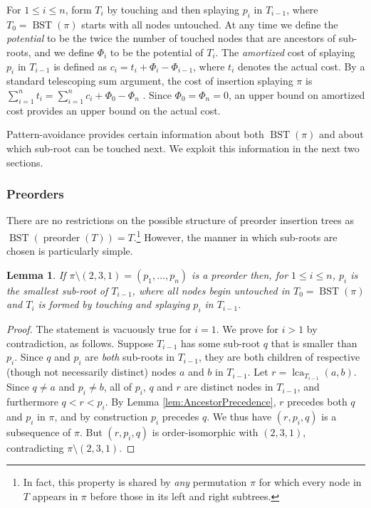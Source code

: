 \documentclass{article}
\theoremstyle{plain}
\newtheorem{lemma}{Lemma}
\theoremstyle{definition}
\DeclareMathOperator{\Preorder}{preorder}
\DeclareMathOperator{\BST}{BST}  %
\DeclareMathOperator{\LCA}{lca}  %
\begin{document}
%
For $1\le i\le n$, form $T_i$ by touching and then splaying $p_i$ in $T_{i-1}$,
where $T_0=\BST(\pi)$ starts with all nodes untouched. At any time we define
the \emph{potential} to be the twice the number of touched nodes that are
ancestors of sub-roots, and we define $\Phi_i$ to be the potential of $T_i$.
The \emph{amortized} cost of splaying $p_i$ in $T_{i-1}$ is defined as
$c_i=t_i+\Phi_i-\Phi_{i-1}$, where $t_i$ denotes the actual cost. By a standard
telescoping sum argument, the cost of insertion splaying $\pi$ is $\sum_{i=1}^n
t_i = \sum_{i=1}^n c_i + \Phi_0 - \Phi_n$ \cite{AMORTIZED_TIME}. Since
$\Phi_0=\Phi_n=0$, an upper bound on amortized cost provides an upper bound on
the actual cost.

%
Pattern-avoidance provides certain information about both $\BST(\pi)$ and about
which sub-root can be touched next. We exploit this information in the next two
sections.

\subsubsection*{Preorders}

%
There are no restrictions on the possible structure of preorder insertion trees
as $\BST(\Preorder(T))=T$.\footnote{In fact, this property is shared by
\emph{any} permutation $\pi$ for which every node in $T$ appears in $\pi$
before those in its left and right subtrees.} However, the manner in which
sub-roots are chosen is particularly simple.

%
\begin{lemma}\label{lem:PreorderSubroots}
If $\pi\setminus(2,3,1)=(p_1,\dots,p_n)$ is a preorder then, for $1\le i\le n$,
$p_i$ is the smallest sub-root of $T_{i-1}$, where all nodes begin untouched in
$T_0=\BST(\pi)$ and $T_i$ is formed by touching and splaying $p_i$ in $T_{i-1}$.
\end{lemma}

%
\begin{proof}
The statement is vacuously true for $i=1$. We prove for $i>1$ by contradiction,
as follows. Suppose $T_{i-1}$ has some sub-root $q$ that is smaller than $p_i$.
Since $q$ and $p_i$ are \emph{both} sub-roots in $T_{i-1}$, they are both
children of respective (though not necessarily distinct) nodes $a$ and $b$ in
$T_{i-1}$. Let $r=\LCA_{T_{i-1}}(a,b)$. Since $q\ne a$ and $p_i\ne b$, all of
$p_i$, $q$ and $r$ are distinct nodes in $T_{i-1}$, and furthermore $q<r<p_i$.
By Lemma \ref{lem:AncestorPrecedence}, $r$ precedes both $q$ and $p_i$ in
$\pi$, and by construction $p_i$ precedes $q$. We thus have $(r,p_i,q)$ is a
subsequence of $\pi$. But $(r,p_i,q)$ is order-isomorphic with $(2,3,1)$,
contradicting $\pi\setminus(2,3,1)$.
\end{proof}
\end{document}
